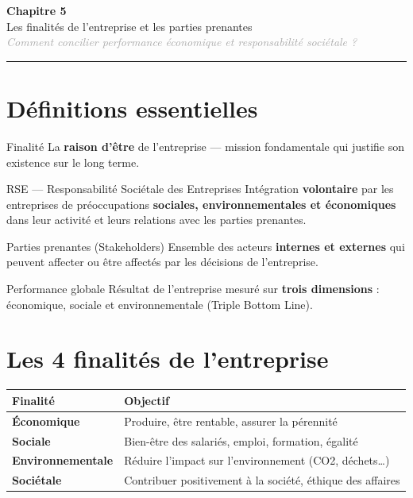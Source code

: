 \documentclass[11pt,a4paper]{article}
\begin{document}
\begin{center}
  {\Large\bfseries\textcolor{mainColor}{Chapitre 5}}\\[2pt]
  {\large Les finalités de l'entreprise et les parties prenantes}\\[4pt]
  \textit{\textcolor{darkGray}{Comment concilier performance économique et responsabilité sociétale ?}}
\end{center}
\vspace{4pt}\hrule\vspace{8pt}

\section*{Définitions essentielles}

\begin{defbox}{Finalité}
La \textbf{raison d'être} de l'entreprise — mission fondamentale qui justifie son existence sur le long terme.
\end{defbox}

\vspace{4pt}
\begin{defbox}{RSE — Responsabilité Sociétale des Entreprises}
Intégration \textbf{volontaire} par les entreprises de préoccupations \textbf{sociales, environnementales et économiques} dans leur activité et leurs relations avec les parties prenantes.
\end{defbox}

\vspace{4pt}
\begin{defbox}{Parties prenantes (Stakeholders)}
Ensemble des acteurs \textbf{internes et externes} qui peuvent affecter ou être affectés par les décisions de l'entreprise.
\end{defbox}

\vspace{4pt}
\begin{defbox}{Performance globale}
Résultat de l'entreprise mesuré sur \textbf{trois dimensions} : économique, sociale et environnementale (Triple Bottom Line).
\end{defbox}

\section*{Les 4 finalités de l'entreprise}

\begin{center}
\begin{tabular}{|l|l|}
\hline
\textbf{Finalité} & \textbf{Objectif} \\
\hline
\textbf{Économique} & Produire, être rentable, assurer la pérennité \\
\textbf{Sociale} & Bien-être des salariés, emploi, formation, égalité \\
\textbf{Environnementale} & Réduire l'impact sur l'environnement (CO2, déchets…) \\
\textbf{Sociétale} & Contribuer positivement à la société, éthique des affaires \\
\hline
\end{tabular}
\end{center}
\end{document}
